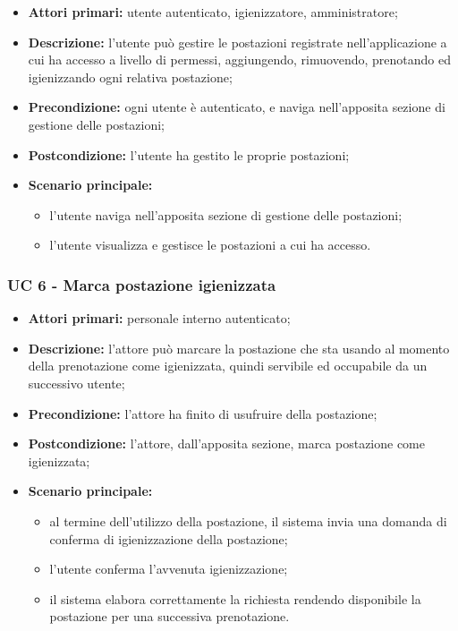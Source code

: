 \begin{itemize}
\item \textbf{Attori primari:} utente autenticato, igienizzatore, amministratore;
\item \textbf{Descrizione:} l’utente può gestire le postazioni registrate nell’applicazione a cui ha accesso a livello di permessi, aggiungendo, rimuovendo, prenotando ed igienizzando ogni relativa postazione;
\item \textbf{Precondizione:} ogni utente è autenticato, e naviga nell’apposita sezione di gestione delle postazioni;
\item \textbf{Postcondizione:} l’utente ha gestito le proprie postazioni;
\item \textbf{Scenario principale:} 
	\begin{itemize}
		\item l’utente naviga nell’apposita sezione di gestione delle postazioni;
		\item l’utente visualizza e gestisce le postazioni a cui ha accesso.
	\end{itemize}
\end{itemize}


\subsubsection{UC 6 - Marca postazione igienizzata}

\begin{itemize}
\item \textbf{Attori primari:} personale interno autenticato;
\item \textbf{Descrizione:} l'attore può marcare la postazione che sta usando al momento della prenotazione come igienizzata, quindi servibile ed occupabile da un successivo utente;
\item \textbf{Precondizione:} l'attore ha finito di usufruire della postazione; 
\item \textbf{Postcondizione:} l’attore, dall'apposita sezione, marca postazione come igienizzata;
\item \textbf{Scenario principale:} 
	\begin{itemize}
		\item al termine dell'utilizzo della postazione, il sistema invia una domanda di conferma di igienizzazione della postazione;		
		\item l’utente conferma l'avvenuta igienizzazione;
		\item il sistema elabora correttamente la richiesta rendendo disponibile la postazione per una successiva prenotazione.
	\end{itemize}
\end{itemize}

